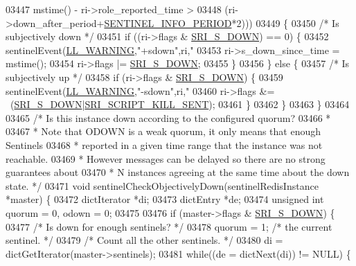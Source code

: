 \begin{DoxyCode}
{{{{{{{{{{{{{{{{{{{{{{{{{{{{{{{{{{{{{{{{{{{{{{{{{{{{{{{{{{{{{{{{{{{{{{{{{{03447          mstime() - ri->role\_reported\_time >
03448           (ri->down\_after\_period+\hyperlink{sentinel_8c_ac6a2144aa06344ed8547176a4e3cfaa5}{SENTINEL\_INFO\_PERIOD}*2)))
03449     \{
03450         \textcolor{comment}{/* Is subjectively down */}
03451         \textcolor{keywordflow}{if} ((ri->flags & \hyperlink{sentinel_8c_a8e26596c8bde451c2dd9cecb2c3046d4}{SRI\_S\_DOWN}) == 0) \{
03452             sentinelEvent(\hyperlink{server_8h_a31229b9334bba7d6be2a72970967a14b}{LL\_WARNING},\textcolor{stringliteral}{"+sdown"},ri,\textcolor{stringliteral}{"%
03453             ri->s\_down\_since\_time = mstime();
03454             ri->flags |= \hyperlink{sentinel_8c_a8e26596c8bde451c2dd9cecb2c3046d4}{SRI\_S\_DOWN};
03455         \}
03456     \} \textcolor{keywordflow}{else} \{
03457         \textcolor{comment}{/* Is subjectively up */}
03458         \textcolor{keywordflow}{if} (ri->flags & \hyperlink{sentinel_8c_a8e26596c8bde451c2dd9cecb2c3046d4}{SRI\_S\_DOWN}) \{
03459             sentinelEvent(\hyperlink{server_8h_a31229b9334bba7d6be2a72970967a14b}{LL\_WARNING},\textcolor{stringliteral}{"-sdown"},ri,\textcolor{stringliteral}{"%
03460             ri->flags &= ~(\hyperlink{sentinel_8c_a8e26596c8bde451c2dd9cecb2c3046d4}{SRI\_S\_DOWN}|\hyperlink{sentinel_8c_a8deaaf376eb76dcf5ab4ca652df3a52b}{SRI\_SCRIPT\_KILL\_SENT});
03461         \}
03462     \}
03463 \}
03464 
03465 \textcolor{comment}{/* Is this instance down according to the configured quorum?}
03466 \textcolor{comment}{ *}
03467 \textcolor{comment}{ * Note that ODOWN is a weak quorum, it only means that enough Sentinels}
03468 \textcolor{comment}{ * reported in a given time range that the instance was not reachable.}
03469 \textcolor{comment}{ * However messages can be delayed so there are no strong guarantees about}
03470 \textcolor{comment}{ * N instances agreeing at the same time about the down state. */}
03471 \textcolor{keywordtype}{void} sentinelCheckObjectivelyDown(sentinelRedisInstance *master) \{
03472     dictIterator *di;
03473     dictEntry *de;
03474     \textcolor{keywordtype}{unsigned} \textcolor{keywordtype}{int} quorum = 0, odown = 0;
03475 
03476     \textcolor{keywordflow}{if} (master->flags & \hyperlink{sentinel_8c_a8e26596c8bde451c2dd9cecb2c3046d4}{SRI\_S\_DOWN}) \{
03477         \textcolor{comment}{/* Is down for enough sentinels? */}
03478         quorum = 1; \textcolor{comment}{/* the current sentinel. */}
03479         \textcolor{comment}{/* Count all the other sentinels. */}
03480         di = dictGetIterator(master->sentinels);
03481         \textcolor{keywordflow}{while}((de = dictNext(di)) != NULL) \{
}}}}}}}}}}}}}}}}}}}}}}}}}}}}}}}}}}}}}}}}}}}}}}}}}}}}}}}}}}}}}}}}}}}}}}}}}}}}
\end{DoxyCode}
